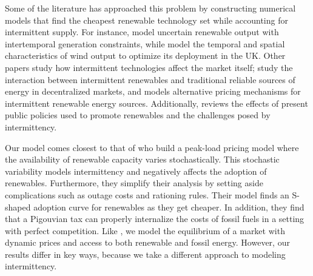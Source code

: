 \documentclass[11pt,a4paper]{extarticle}
\begin{document}
Some of the literature has approached this problem by constructing numerical models that find the cheapest renewable technology set while accounting for intermittent supply. For instance, \citet{MN2006} model uncertain renewable output with intertemporal generation constraints, while \citet{NCK2007} model the temporal and spatial characteristics of wind output to optimize its deployment in the UK. Other papers study how intermittent technologies affect the market itself; \citet{AC2012} study the interaction between intermittent renewables and traditional reliable sources of energy in decentralized markets, and \citet{Chao2011} models alternative pricing mechanisms for intermittent renewable energy sources. Additionally, \citet{Boren2012} reviews the effects of present public policies used to promote renewables and the challenges posed by intermittency. 

Our model comes closest to that of \citet{HH} who build a peak-load pricing model where the availability of renewable capacity varies stochastically. This stochastic variability models intermittency and negatively affects the adoption of renewables. Furthermore, they simplify their analysis by setting aside complications such as  outage costs and rationing rules. Their model finds an S-shaped adoption curve for renewables as they get cheaper. In addition, they find that a Pigouvian tax can properly internalize the costs of fossil fuels in a setting with perfect competition. Like \citeauthor{HH}, we model the  equilibrium of a market with dynamic prices and access to both renewable and fossil energy. However, our results differ in key ways, because we take a different approach to modeling intermittency. 
\end{document}
